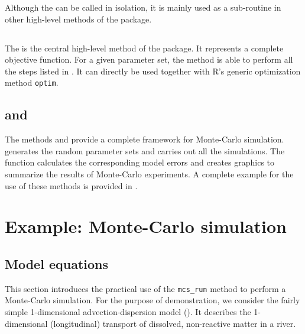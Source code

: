 Although the  can be called in isolation, it is mainly used as a sub-routine in other high-level methods of the  package.

\subsection{} \label{sec:mops:methods:modelError_multiDim}

The  is the central high-level method of the  package. It represents a complete objective function. For a given parameter set, the method is able to perform all the steps listed in . It can directly be used together with R's generic optimization method \texttt{optim}.

\subsection{ and } \label{sec:mops:methods:mcs}

The methods  and  provide a complete framework for Monte-Carlo simulation.  generates the random parameter sets and carries out all the simulations.  The function  calculates the corresponding model errors and creates graphics to summarize the results of Monte-Carlo experiments. A complete example for the use of these methods is provided in .


\section{Example: Monte-Carlo simulation} \label{sec:mops:example_mcs}

\subsection{Model equations} \label{sec:mops:example_mcs:modelEqn}

This section introduces the practical use of the \texttt{mcs\_run} method to perform a Monte-Carlo simulation. For the purpose of demonstration, we consider the fairly simple 1-dimensional advection-dispersion model (). It describes the 1-dimensional (longitudinal) transport of dissolved, non-reactive matter in a river.

